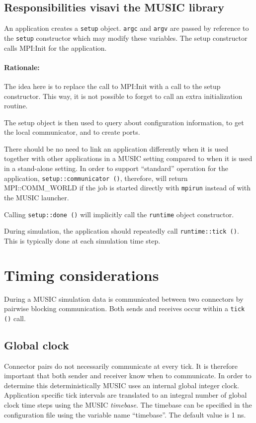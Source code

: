 \documentclass[a4paper]{report}
\newenvironment{rationale}%
{\par\paragraph{Rationale:}}%
{\par}
\begin{document}
\subsection{Responsibilities visavi the MUSIC library}
\label{sec:responsibilities}

An application creates a \verb|setup| object.  \verb|argc| and
\verb|argv| are passed by reference to the \verb|setup| constructor
which may modify these variables.  The setup constructor calls
MPI:Init for the application.

\begin{rationale}
  The idea here is to replace the call to MPI:Init with a call to the
  setup constructor.  This way, it is not possible to forget to call
  an extra initialization routine.
\end{rationale}

The setup object is then used to query about configuration
information, to get the local communicator, and to create ports.

There should be no need to link an application differently when it is
used together with other applications in a MUSIC setting compared to
when it is used in a stand-alone setting.  In order to support
``standard'' operation for the application,
\verb|setup::communicator ()|, therefore, will return MPI::COMM\_WORLD
if the job is started directly with \verb|mpirun| instead of with the
MUSIC launcher.

Calling \verb|setup::done ()| will implicitly call the \verb|runtime|
object constructor.

During simulation, the application should repeatedly call
\verb|runtime::tick ()|.  This is typically done at each simulation
time step.

\section{Timing considerations}

During a MUSIC simulation data is communicated between two connectors
by pairwise blocking communication.  Both sends and receives occur
within a \verb|tick ()| call.

\subsection{Global clock}

Connector pairs do not necessarily communicate at every tick.  It is
therefore important that both sender and receiver know when to
communicate.  In order to determine this deterministically MUSIC uses
an internal global integer clock.  Application specific tick intervals
are translated to an integral number of global clock time steps using
the MUSIC \emph{timebase}.  The timebase can be specified in the
configuration file using the variable name ``timebase''.  The default
value is 1 ns.
\end{document}
